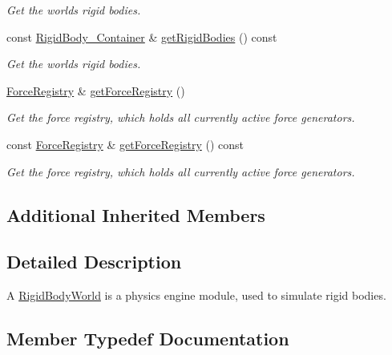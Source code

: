 \begin{DoxyCompactItemize}
\begin{DoxyCompactList}\small\item\em Get the world\textquotesingle{}s rigid bodies. \end{DoxyCompactList}\item 
const \mbox{\hyperlink{classr3_1_1_rigid_body_world_abe8c123eee198b6f8eca079e71302bcb}{Rigid\+Body\+\_\+\+Container}} \& \mbox{\hyperlink{classr3_1_1_rigid_body_world_abf3bfd4b5d7ed2e843362e555b9eebb2}{get\+Rigid\+Bodies}} () const
\begin{DoxyCompactList}\small\item\em Get the world\textquotesingle{}s rigid bodies. \end{DoxyCompactList}\item 
\mbox{\hyperlink{classr3_1_1_force_registry}{Force\+Registry}} \& \mbox{\hyperlink{classr3_1_1_rigid_body_world_acfdc56e2796e5e0d86dbf71582e1b8c2}{get\+Force\+Registry}} ()
\begin{DoxyCompactList}\small\item\em Get the force registry, which holds all currently active force generators. \end{DoxyCompactList}\item 
const \mbox{\hyperlink{classr3_1_1_force_registry}{Force\+Registry}} \& \mbox{\hyperlink{classr3_1_1_rigid_body_world_a5ec345de8bdc6e910797434de918dbc2}{get\+Force\+Registry}} () const
\begin{DoxyCompactList}\small\item\em Get the force registry, which holds all currently active force generators. \end{DoxyCompactList}\end{DoxyCompactItemize}
\subsection*{Additional Inherited Members}


\subsection{Detailed Description}
A \mbox{\hyperlink{classr3_1_1_rigid_body_world}{Rigid\+Body\+World}} is a physics engine module, used to simulate rigid bodies. 

\subsection{Member Typedef Documentation}
\mbox{\label{classr3_1_1_rigid_body_world_abe8c123eee198b6f8eca079e71302bcb}} 
